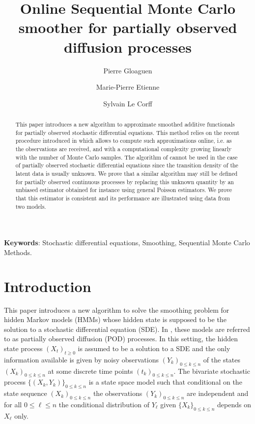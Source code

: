 \documentclass[12pt]{article}
\newcommand{\1}{\mathrm{1}}
\begin{document}
\author{Pierre Gloaguen\footnotemark[1] \and Marie-Pierre Etienne\footnotemark[1] \and Sylvain Le {C}orff\footnotemark[2]}
 


\title{Online Sequential Monte Carlo smoother for partially observed diffusion processes}


\maketitle

\begin{abstract}
This paper introduces a new algorithm to approximate smoothed additive functionals for partially observed stochastic differential equations. 
This method relies on the recent procedure introduced in \cite{olsson:westerborn:2016} which allows to compute such approximations online, i.e. as the observations are received, and with a computational complexity growing linearly with the number of Monte Carlo samples. 
The algorithm of \cite{olsson:westerborn:2016} cannot be used in the case of partially observed stochastic differential equations since the transition density of the latent data is usually unknown. 
We prove that a similar algorithm may still be defined for partially observed continuous processes by replacing this unknown quantity by an unbiased estimator obtained for instance using general Poisson estimators. 
We prove that this estimator is consistent and its performance are illustrated using data from two models. 
\end{abstract}

{\bf Keywords}: Stochastic differential equations, Smoothing, Sequential Monte Carlo Methods. 

\section{Introduction}
This paper introduces a new algorithm to solve the smoothing problem for hidden Markov models (HMMs) whose hidden state is supposed to be the solution to a stochastic differential equation (SDE). In \cite{olsson:strojby:2011}, these models are referred to as partially observed diffusion (POD) processes.
 In this setting, the hidden state process $(X_t)_{t\ge 0}$ is assumed to be a solution to a SDE and the only information available is given by noisy observations $(Y_{k})_{0\le k\le n}$ of the states $(X_k)_{0\le k\le  n}$ at some discrete time points $(t_k)_{0\le k\le n}$.
  The bivariate stochastic process $\{(X_{k},Y_{k})\}_{0\le k\le n}$ is a state space model such that conditional on the state sequence $(X_{k})_{0\le k\le n}$ the observations $(Y_{k})_{0\le k\le n}$ are independent and for all $0\le \ell\le n$ the conditional distribution of $Y_{\ell}$ given $\{X_{k}\}_{0\le k\le n}$ depends on $X_{\ell}$ only.
\end{document}
